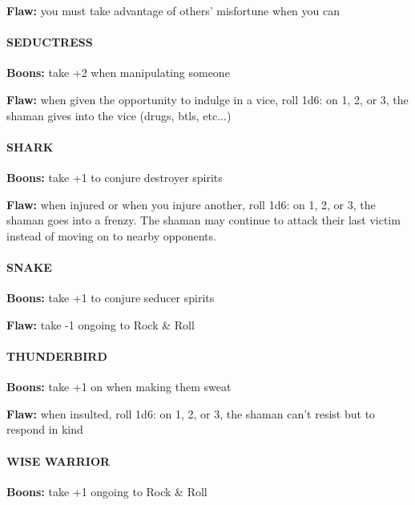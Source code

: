 \documentclass[oneside,10pt]{article}
\begin{document}
\begin{multicols}{2}
\begin{dent}
\textbf{Flaw:} you must take advantage of others’ misfortune
when you can
\end{dent}

\paragraph{SEDUCTRESS}
\begin{dent}
\textbf{Boons:} take +2 when manipulating someone

\textbf{Flaw:} when given the opportunity to indulge in a vice, roll 1d6: on 1, 2, or 3, the shaman gives into the vice (drugs, btls, etc...)
\end{dent}


\paragraph{SHARK}
\begin{dent}
\textbf{Boons:} take +1 to conjure destroyer spirits

\textbf{Flaw:} when injured or when you injure another, roll 1d6: on 1, 2, or 3, the shaman
goes into a frenzy. The shaman may continue to attack their last victim instead of moving on to nearby opponents. 
\end{dent}


\paragraph{SNAKE}
\begin{dent}
\textbf{Boons:} take +1 to conjure seducer spirits

\textbf{Flaw:} take -1 ongoing to Rock \& Roll
\end{dent}

\paragraph{THUNDERBIRD}
\begin{dent}
\textbf{Boons:} take +1 on when making them sweat

\textbf{Flaw:} when insulted, roll 1d6: on 1, 2, or 3, the shaman can't resist but to respond in kind
\end{dent}

\paragraph{WISE WARRIOR}
\begin{dent}
\textbf{Boons:} take +1 ongoing to Rock \& Roll


\end{dent}
\end{multicols}
\end{document}
